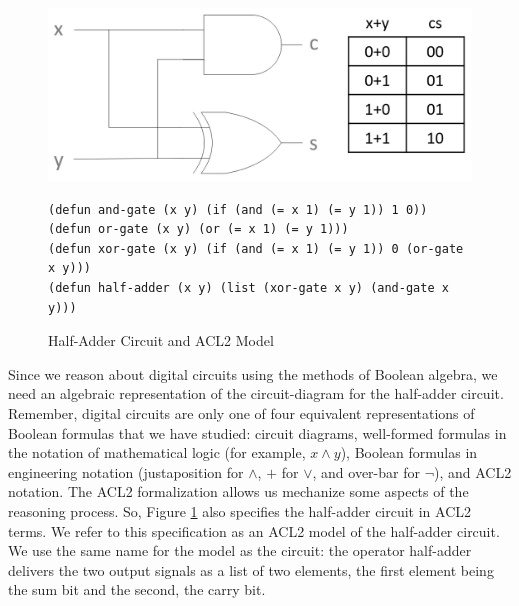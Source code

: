 \begin{figure}
\begin{center}
\includegraphics[scale=0.23]{Images/half-adder.png}
\begin{Verbatim}
(defun and-gate (x y) (if (and (= x 1) (= y 1)) 1 0))
(defun or-gate (x y) (or (= x 1) (= y 1)))
(defun xor-gate (x y) (if (and (= x 1) (= y 1)) 0 (or-gate x y)))
(defun half-adder (x y) (list (xor-gate x y) (and-gate x y)))
\end{Verbatim}
\end{center}
\caption{Half-Adder Circuit and ACL2 Model}
\label{fig:half-adder}
\end{figure}

Since we reason about digital circuits using the methods
of Boolean algebra, we need an algebraic representation
of the circuit-diagram for the half-adder circuit.
Remember, digital circuits are only one of four
equivalent representations of Boolean formulas that
we have studied: circuit diagrams, well-formed formulas
in the notation of mathematical logic (for example, $x \wedge y$),
Boolean formulas in engineering notation (justaposition for $\wedge$,
$+$ for $\vee$, and over-bar for $\neg$), and ACL2 notation.
The ACL2 formalization allows us mechanize some aspects of the reasoning process.
So, Figure \ref{fig:half-adder} also specifies the half-adder circuit in ACL2 terms.
We refer to this specification as an
ACL2 model of the half-adder circuit.
We use the same name for the model as the circuit:
the operator \textsf{half-adder}
delivers the two output signals as a list of two elements,
the first element being the sum bit and the second, the carry bit.

